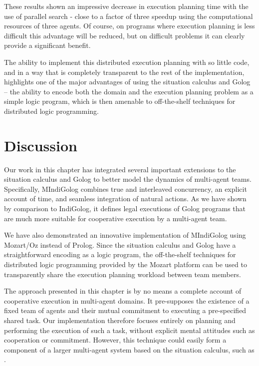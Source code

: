 These results shown an impressive decrease in execution planning time
with the use of parallel search - close to a factor of three speedup
using the computational resources of three agents. Of course, on programs
where execution planning is less difficult this advantage will be
reduced, but on difficult problems it can clearly provide a significant
benefit.

The ability to implement this distributed execution planning with
so little code, and in a way that is completely transparent to the
rest of the implementation, highlights one of the major advantages
of using the situation calculus and Golog -- the ability to encode
both the domain and the execution planning problem as a simple logic
program, which is then amenable to off-the-shelf techniques for distributed
logic programming.


\section{Discussion\label{sec:MIndiGolog:Discussion}}

Our work in this chapter has integrated several important extensions
to the situation calculus and Golog to better model the dynamics of
multi-agent teams. Specifically, MIndiGolog combines true and interleaved
concurrency, an explicit account of time, and seamless integration
of natural actions. As we have shown by comparison to IndiGolog, it
defines legal executions of Golog programs that are much more suitable
for cooperative execution by a multi-agent team.

We have also demonstrated an innovative implementation of MIndiGolog
using Mozart/Oz instead of Prolog. Since the situation calculus and
Golog have a straightforward encoding as a logic program, the off-the-shelf
techniques for distributed logic programming provided by the Mozart
platform can be used to transparently share the execution planning
workload between team members.

The approach presented in this chapter is by no means a complete
account of cooperative execution in multi-agent domains. It pre-supposes
the existence of a fixed team of agents and their mutual commitment
to executing a pre-specified shared task. Our implementation therefore
focuses entirely on planning and performing the execution of such
a task, without explicit mental attitudes such as cooperation or commitment.
However, this technique could easily form a component of a larger
multi-agent system based on the situation calculus, such as \citep{shapiro02casl,lesperance05ecasl}.

